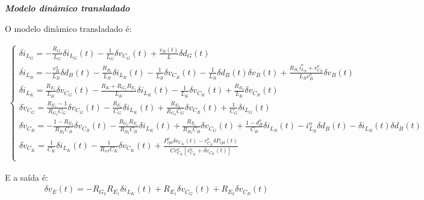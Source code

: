 \documentclass{article}
\newcommand{\ds}{\displaystyle}
\begin{document}
\textbf{\textit{Modelo dinâmico transladado}} \vspace*{12pt}

O modelo dinâmico transladado é:

\begin{gather}
  \begin{cases}
    \delta \dot{i}_{L_G} = \ds - \frac{R_{G_1}}{L_G} \delta i_{L_G}(t) - \frac{1}{L_G} \delta v_{C_G}(t) + \frac{v_B(t)}{L} \delta d_G(t) \\[14pt]
    \delta \dot{i}_{L_B} = \ds - \frac{v_B^o}{L_B} \delta d_B(t) - \frac{R_{B_1}}{L_B} \delta i_{L_B}(t)
    - \frac{1}{L_B} \delta v_{C_B}(t) - \frac{1}{L_B} \delta d_B(t) \delta v_B(t)
    + \frac{R_{B_1} i_{L_B}^o + v_{C_B}^o}{L_B v_B^o} \delta v_B(t)                                                                       \\[14pt]
    \delta \dot{i}_{L_K} = \ds \frac{R_{E_1}}{L_K} \delta v_{C_G}(t) - \frac{R_K+R_{G_2}R_{E_1}}{L_K} \delta i_{L_K}(t)
    - \frac{1}{L_K} \delta v_{C_K}(t) + \frac{R_{E_2}}{L_K} \delta v_{C_B}(t)                                                             \\[14pt]
    \delta \dot{v}_{C_G} = \ds \frac{R_{E_1} - 1}{R_{G_2} C_G} \delta v_{C_G}(t)
    - \frac{R_{E_1}}{C_G} \delta i_{L_K}(t)
    + \frac{R_{E_2}}{R_{G_2} C_G} \delta v_{C_B}(t) + \frac{1}{C_G} \delta i_{L_G}(t)                                                     \\[14pt]
    \delta \dot{v}_{C_B} = \ds - \frac{1 - R_{E_2}}{R_{B_2}C_B} \delta v_{C_B}(t)
    - \frac{R_{G_2} R_{E_1}}{R_{B_2}C_B} \delta i_{L_K}(t)
    + \frac{R_{E_1}}{R_{B_2}C_B} \delta v_{C_G}(t)
    + \frac{1 - d_B^o}{C_B} \delta i_{L_B}(t)
    - i_{L_B}^o \delta d_B(t) - \delta i_{L_B}(t) \delta d_B(t)                                                                           \\[14pt]
    \delta \dot{v}_{C_K} = \ds \frac{1}{C_K} \delta i_{L_K}(t)
    - \frac{1}{R_{crl} C_K} \delta v_{C_K}(t)
    + \frac{P_{cpl}^o \delta v_{C_K}(t) - v_{C_K}^o \delta P_{cpl}(t)}{Cv_{C_K}^o\left[v_{C_K}^o + \delta v_{C_K}(t)\right]}              \\[14pt]
  \end{cases}
\end{gather}

E a saída é:
\begin{gather}
  \delta v_E(t) = - R_{G_2} R_{E_1} \delta i_{L_K}(t) + R_{E_1} \delta v_{C_G}(t) + R_{E_2} \delta v_{C_B}(t)
\end{gather}
\end{document}
